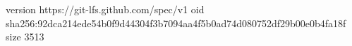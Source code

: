 version https://git-lfs.github.com/spec/v1
oid sha256:92dca214ede54b0f9d44304f3b7094aa4f5b0ad74d080752df29b00e0b4fa18f
size 3513
